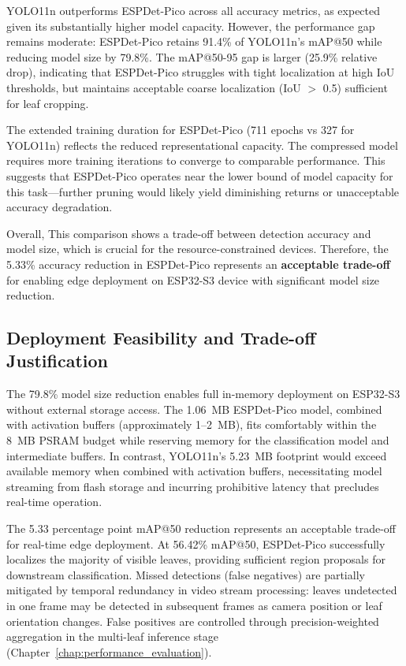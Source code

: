 YOLO11n outperforms ESPDet-Pico across all accuracy metrics, as expected given its substantially higher model capacity. However, the performance gap remains moderate: ESPDet-Pico retains 91.4\% of YOLO11n's mAP@50 while reducing model size by 79.8\%. The mAP@50-95 gap is larger (25.9\% relative drop), indicating that ESPDet-Pico struggles with tight localization at high IoU thresholds, but maintains acceptable coarse localization (IoU $>$ 0.5) sufficient for leaf cropping.

The extended training duration for ESPDet-Pico (711 epochs vs 327 for YOLO11n) reflects the reduced representational capacity. The compressed model requires more training iterations to converge to comparable performance. This suggests that ESPDet-Pico operates near the lower bound of model capacity for this task—further pruning would likely yield diminishing returns or unacceptable accuracy degradation.

Overall, This comparison shows a trade-off between detection accuracy and model size, which is crucial for the resource-constrained devices. Therefore,
the 5.33\% accuracy reduction in ESPDet-Pico represents an \textbf{acceptable trade-off} for enabling edge deployment on ESP32-S3 device with significant model size reduction.

\subsection{Deployment Feasibility and Trade-off Justification}

The 79.8\% model size reduction enables full in-memory deployment on ESP32-S3 without external storage access. The 1.06~MB ESPDet-Pico model, combined with activation buffers (approximately 1--2~MB), fits comfortably within the 8~MB PSRAM budget while reserving memory for the classification model and intermediate buffers. In contrast, YOLO11n's 5.23~MB footprint would exceed available memory when combined with activation buffers, necessitating model streaming from flash storage and incurring prohibitive latency that precludes real-time operation.

The 5.33 percentage point mAP@50 reduction represents an acceptable trade-off for real-time edge deployment. At 56.42\% mAP@50, ESPDet-Pico successfully localizes the majority of visible leaves, providing sufficient region proposals for downstream classification. Missed detections (false negatives) are partially mitigated by temporal redundancy in video stream processing: leaves undetected in one frame may be detected in subsequent frames as camera position or leaf orientation changes. False positives are controlled through precision-weighted aggregation in the multi-leaf inference stage (Chapter~\ref{chap:performance_evaluation}).

